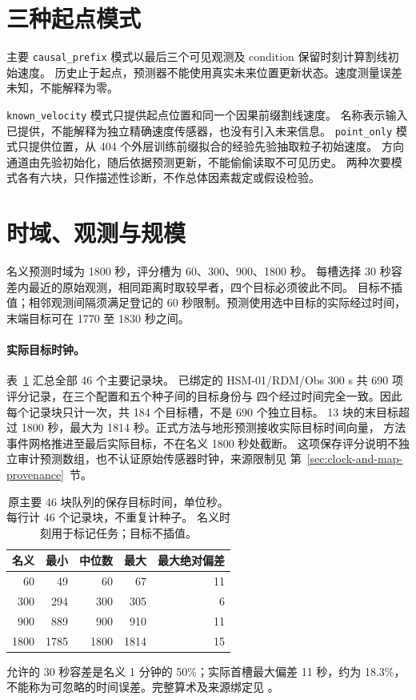 \section{三种起点模式}
主要 \texttt{causal\_prefix} 模式以最后三个可见观测及 condition 保留时刻计算割线初始速度。
历史止于起点，预测器不能使用真实未来位置更新状态。速度测量误差未知，不能解释为零。

\texttt{known\_velocity} 模式只提供起点位置和同一个因果前缀割线速度。
名称表示输入已提供，不能解释为独立精确速度传感器，也没有引入未来信息。
\texttt{point\_only} 模式只提供位置，从 404 个外层训练前缀拟合的经验先验抽取粒子初始速度。
方向通道由先验初始化，随后依据预测更新，不能偷偷读取不可见历史。
两种次要模式各有六块，只作描述性诊断，不作总体因素裁定或假设检验。


\section{时域、观测与规模}
名义预测时域为 1800 秒，评分槽为 60、300、900、1800 秒。
每槽选择 30 秒容差内最近的原始观测，相同距离时取较早者，四个目标必须彼此不同。
目标不插值；相邻观测间隔须满足登记的 60 秒限制。预测使用选中目标的实际经过时间，
末端目标可在 1770 至 1830 秒之间。

\paragraph{实际目标时钟。}\label{sec:target-times}\hypertarget{sec:target-times}{}
表~\ref{tab:actual-target-times} 汇总全部 46 个主要记录块。
已绑定的 HSM-01/RDM/Obs 300 s 共 690 项评分记录，在三个配置和五个种子间的目标身份与
四个经过时间完全一致。因此每个记录块只计一次，共 184 个目标槽，不是 690 个独立目标。
13 块的末目标超过 1800 秒，最大为 1814 秒。正式方法与地形预测接收实际目标时间向量，
方法事件网格推进至最后实际目标，不在名义 1800 秒处截断。
这项保存评分说明不独立审计预测数组，也不认证原始传感器时钟，来源限制见
第~\ref{sec:clock-and-map-provenance}~节。

\begin{table}[htbp]
\centering\small
\caption{原主要 46 块队列的保存目标时间，单位秒。每行计 46 个记录块，不重复计种子。
名义时刻用于标记任务；目标不插值。}
\label{tab:actual-target-times}\hypertarget{tab:actual-target-times}{}
\begin{tabular}{@{}rrrrr@{}}
\toprule
名义 & 最小 & 中位数 & 最大 & 最大绝对偏差\\
\midrule
60 & 49 & 60 & 67 & 11\\
300 & 294 & 300 & 305 & 6\\
900 & 889 & 900 & 910 & 11\\
1800 & 1785 & 1800 & 1814 & 15\\
\bottomrule
\end{tabular}
\end{table}
允许的 30 秒容差是名义 1 分钟的 50\%；实际首槽最大偏差 11 秒，约为 18.3\%，
不能称为可忽略的时间误差。完整算术及来源绑定见
。

